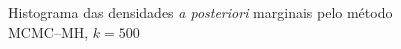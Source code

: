 \documentclass[12pt,reqno,a4paper,oneside]{article}
\begin{document}
\begin{figure}[t]
	\caption{Histograma das densidades \textit{a posteriori} marginais pelo método MCMC--MH, $k = 500$}%
\end{figure}
\end{document}
